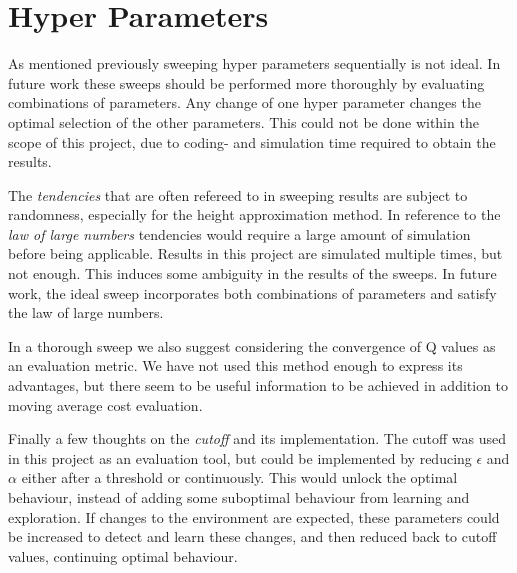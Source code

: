 \section{Hyper Parameters}
As mentioned previously sweeping hyper parameters sequentially is not ideal. In future work these sweeps should be performed more thoroughly by evaluating combinations of parameters. Any change of one hyper parameter changes the optimal selection of the other parameters. This could not be done within the scope of this project, due to coding- and simulation time required to obtain the results. 

The \textit{tendencies} that are often refereed to in sweeping results are subject to randomness, especially for the height approximation method. In reference to the \textit{law of large numbers} tendencies would require a large amount of simulation before being applicable. Results in this project are simulated multiple times, but not enough. This induces some ambiguity in the results of the sweeps. In future work, the ideal sweep incorporates both combinations of parameters and satisfy the law of large numbers.

In a thorough sweep we also suggest considering the convergence of Q values as an evaluation metric. We have not used this method enough to express its advantages, but there seem to be useful information to be achieved in addition to moving average cost evaluation.

Finally a few thoughts on the \textit{cutoff} and its implementation. The cutoff was used in this project as an evaluation tool, but could be implemented by reducing $\epsilon$ and $\alpha$ either after a threshold or continuously. This would unlock the optimal behaviour, instead of adding some suboptimal behaviour from learning and exploration. If changes to the environment are expected, these parameters could be increased to detect and learn these changes, and then reduced back to cutoff values, continuing optimal behaviour.

